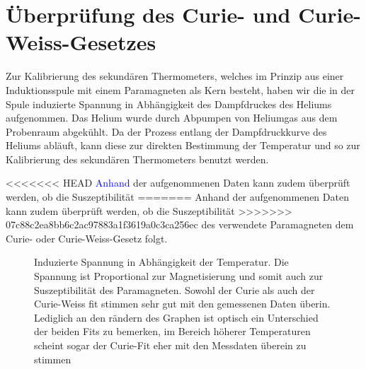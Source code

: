 \documentclass[bigchapter,colorback,accentcolor=tud4b,linedtoc,11pt]{tudreport}
\begin{document}
\section{Überprüfung des Curie- und Curie-Weiss-Gesetzes}
Zur Kalibrierung des sekundären Thermometers, welches im Prinzip aus einer
Induktionsspule mit einem Paramagneten als Kern besteht, haben wir die in der
Spule induzierte Spannung in Abhängigkeit des Dampfdruckes des Heliums
aufgenommen. Das Helium wurde durch Abpumpen von Heliumgas aus dem Probenraum
abgekühlt. Da der Prozess entlang der Dampfdruckkurve des Heliums abläuft, kann
diese zur direkten Bestimmung der Temperatur und so zur Kalibrierung des
sekundären Thermometers benutzt werden.

<<<<<<< HEAD
\textcolor{blue}{Anhand} der aufgenommenen Daten kann zudem überprüft werden, ob die Suszeptibilität
=======
Anhand der aufgenommenen Daten kann zudem überprüft werden, ob die Suszeptibilität
>>>>>>> 07c88c2ea8bb6c2ac97883a1f3619a0c3ca256ec
des verwendete Paramagneten dem Curie- oder Curie-Weiss-Gesetz folgt.
\begin{figure}[H]
    \caption{Induzierte Spannung in Abhängigkeit der Temperatur. Die Spannung
        ist Proportional zur Magnetisierung und somit auch zur Suszeptibilität des
        Paramagneten. Sowohl der Curie als auch der Curie-Weiss fit stimmen sehr gut
        mit den gemessenen Daten überin. Lediglich an den rändern des Graphen ist
        optisch ein Unterschied der beiden Fits zu bemerken, im Bereich höherer
        Temperaturen scheint sogar der Curie-Fit eher mit den Messdaten überein zu stimmen}
\end{figure}
\end{document}
